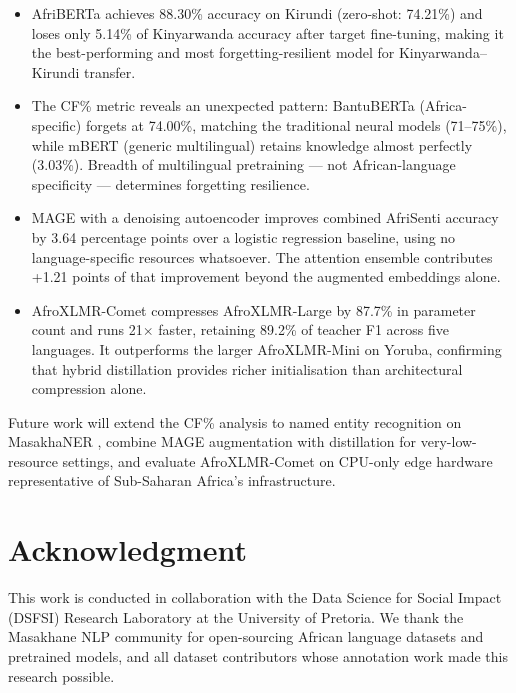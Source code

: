 \documentclass[conference]{IEEEtran}
\begin{document}
\begin{itemize}
  \item AfriBERTa achieves 88.30\% accuracy on Kirundi (zero-shot:
  74.21\%) and loses only 5.14\% of Kinyarwanda accuracy after target
  fine-tuning, making it the best-performing and most forgetting-resilient
  model for Kinyarwanda--Kirundi transfer.

  \item The CF\% metric reveals an unexpected pattern: BantuBERTa
  (Africa-specific) forgets at 74.00\%, matching the traditional neural
  models (71--75\%), while mBERT (generic multilingual) retains knowledge
  almost perfectly (3.03\%). Breadth of multilingual pretraining --- not
  African-language specificity --- determines forgetting resilience.

  \item MAGE with a denoising autoencoder improves combined AfriSenti
  accuracy by 3.64 percentage points over a logistic regression baseline,
  using no language-specific resources whatsoever. The attention ensemble
  contributes +1.21 points of that improvement beyond the augmented
  embeddings alone.

  \item AfroXLMR-Comet compresses AfroXLMR-Large by 87.7\% in parameter
  count and runs 21$\times$ faster, retaining 89.2\% of teacher F1 across
  five languages. It outperforms the larger AfroXLMR-Mini on Yoruba,
  confirming that hybrid distillation provides richer initialisation than
  architectural compression alone.
\end{itemize}

Future work will extend the CF\% analysis to named entity recognition on
MasakhaNER \cite{b_adelani_ner}, combine MAGE augmentation with
distillation for very-low-resource settings, and evaluate AfroXLMR-Comet
on CPU-only edge hardware representative of Sub-Saharan Africa's
infrastructure.

\section*{Acknowledgment}
This work is conducted in collaboration with the Data Science for Social
Impact (DSFSI) Research Laboratory at the University of Pretoria.
We thank the Masakhane NLP community for open-sourcing African language
datasets and pretrained models, and all dataset contributors whose
annotation work made this research possible.
\end{document}
